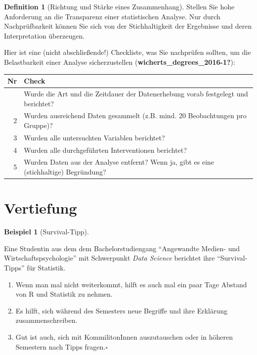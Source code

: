 \documentclass[
  a4paper,
  DIV=11]{scrreprt}
\providecommand{\tightlist}{%
  \setlength{\itemsep}{0pt}\setlength{\parskip}{0pt}}\usepackage{longtable,booktabs,array}
\theoremstyle{definition}
\theoremstyle{definition}
\newtheorem{example}{Beispiel}[chapter]
\theoremstyle{definition}
\newtheorem{definition}{Definition}[chapter]
\theoremstyle{remark}
\begin{document}
\begin{definition}[Richtung und Stärke eines
Zusammenhang]
\label{callout-important}
Stellen Sie hohe Anforderung an die Transparenz einer statistischen
Analyse. Nur durch Nachprüfbarkeit können Sie sich von der
Stichhaltigkeit der Ergebnisse und deren Interpretation überzeugen.

Hier ist eine (nicht abschließende!) Checkliste, was Sie nachprüfen
sollten, um die Belastbarkeit einer Analyse sicherzustellen
(\textbf{wicherts\_degrees\_2016-1?}):

\begin{longtable*}{rl}
\toprule
Nr & Check \\ 
\midrule{} & Wurde die Art und die Zeitdauer der Datenerhebung vorab festgelegt und berichtet? \\ 
2 & Wurden ausreichend Daten gesammelt (z.B. mind. 20 Beobachtungen pro Gruppe)? \\ 
3 & Wurden alle untersuchten Variablen berichtet? \\ 
4 & Wurden alle durchgeführten Interventionen berichtet? \\ 
5 & Wurden Daten aus der Analyse entfernt? Wenn ja, gibt es eine (stichhaltige) Begründung? \\ 
\bottomrule
\end{longtable*}

\section{Vertiefung}\label{vertiefung-5}

\begin{example}[Survival-Tipp]\protect\hypertarget{exm-survival1}{}\label{exm-survival1}

Eine Studentin aus dem dem Bachelorstudiengang ``Angewandte Medien- und
Wirtschaftspsychologie'' mit Schwerpunkt \emph{Data Science} berichtet
ihre ``Survival-Tipps'' für Statistik.

\begin{enumerate}
\def\labelenumi{\arabic{enumi}.}
\tightlist
\item
  Wenn man mal nicht weiterkommt, hilft es auch mal ein paar Tage
  Abstand von R und Statistik zu nehmen.
\item
  Es hilft, sich während des Semesters neue Begriffe und ihre Erklärung
  zusammenschreiben.
\item
  Gut ist auch, sich mit KommilitonInnen auszutauschen oder in höheren
  Semestern nach Tipps fragen.\(\square\)
\end{enumerate}


\end{example}
\end{definition}
\end{document}
